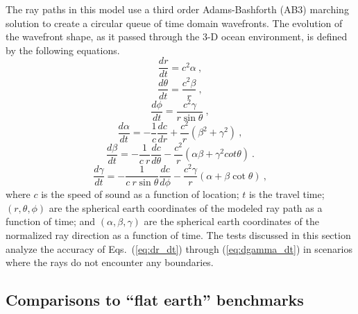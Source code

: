 \documentclass{ws-jca}
\begin{document}
The ray paths in this model use a third order Adams-Bashforth (AB3)
marching solution\cite{Yakowitz1986} to create a circular queue of time
domain wavefronts. The evolution of the wavefront shape, as it passed
through the 3-D ocean environment, is defined by the following equations.
\begin{equation}
	\frac{dr}{dt} = c^2 \alpha \:,
	\label{eq:dr_dt}
\end{equation}
\begin{equation}
	\frac{d\theta}{dt} = \frac{c^2 \beta}{r} \:,
	\label{eq:dtheta_dt}
\end{equation}
\begin{equation}
	\frac{d\phi}{dt} = \frac{c^2\gamma}{r \sin{\theta}} \:,
	\label{eq:dphi_dt}
\end{equation}
\begin{equation}
	\frac{d\alpha}{dt} = -\frac{1}{c}\frac{dc}{dr} 
		+ \frac{c^2}{r}\left( \beta^2 + \gamma^2 \right) \:,
	\label{eq:dalpha_dt}
\end{equation}
\begin{equation}
	\frac{d\beta}{dt} = -\frac{1}{c \: r}\frac{dc}{d\theta} 
		- \frac{c^2}{r} \left( \alpha \beta + \gamma^2 cot\theta \right) \:.
	\label{eq:dbeta_dt}
\end{equation}
\begin{equation}
	\frac{d\gamma}{dt} = -\frac{1}{c \: r \sin{\theta}}\frac{dc}{d\phi} 
		- \frac{c^2 \gamma}{r} \left( \alpha + \beta \cot{\theta} \right) \:,
	\label{eq:dgamma_dt}
\end{equation}
where 
$c$ is the speed of sound as a function of location;
$t$ is the travel time;
\((r, \theta, \phi)\) are the spherical earth coordinates of the modeled ray 
path as a function of time; and
\((\alpha, \beta, \gamma)\) are the spherical earth coordinates of the 
normalized ray direction as a function of time.
The tests discussed in this section analyze the accuracy of
Eqs.~(\ref{eq:dr_dt}) through (\ref{eq:dgamma_dt}) in scenarios where the
rays do not encounter any boundaries.

\subsection{Comparisons to ``flat earth'' benchmarks}
\end{document}
